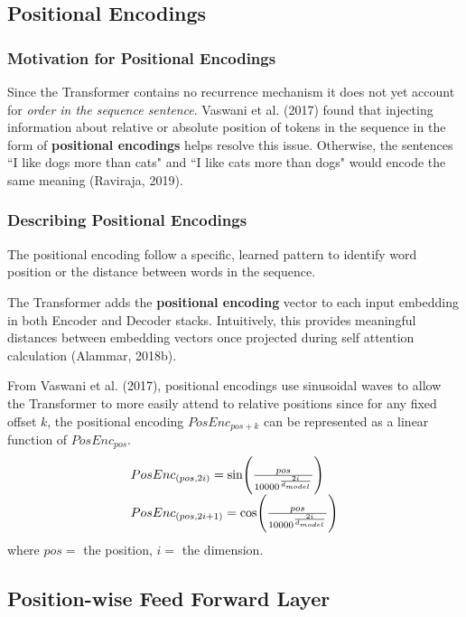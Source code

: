 \subsection{Positional Encodings} \label{sec:PosEncodings}

\subsubsection{Motivation for Positional Encodings}

Since the Transformer contains no recurrence mechanism it does not yet account for \emph{order in the sequence sentence}. Vaswani et al. (2017) found that injecting information about relative or absolute position of tokens in the sequence in the form of \textbf{positional encodings} helps resolve this issue. 
Otherwise, the sentences ``I like dogs more than cats" and ``I like cats more than dogs" would encode the same meaning (Raviraja, 2019). 

\subsubsection{Describing Positional Encodings}

The positional encoding follow a specific, learned pattern to identify word position or the distance between words in the sequence. 

The Transformer adds the \textbf{positional encoding} vector to each input embedding in both Encoder and Decoder stacks. Intuitively, this provides meaningful distances between embedding vectors once projected during self attention calculation (Alammar, 2018b). 

From Vaswani et al. (2017), positional encodings use sinusoidal waves to allow the Transformer to more easily attend to relative positions since for any fixed offset $k$, the positional encoding $PosEnc_{pos + k}$ can be represented as a linear function of $PosEnc_{pos}$.
$$
\begin{array}{ll}
PosEnc_{\Large (pos, 2i)} = \text{sin} \Bigg(\frac {pos} {10000^{\Large \frac {2i} {d_{model}} } }  \Bigg) \\
PosEnc_{\Large (pos, 2i + 1)} = \text{cos} \Bigg(\frac {pos} {10000^{\Large \frac {2i} {d_{model}} } }  \Bigg)
\end{array}
$$
where $pos = $ the position, $i = $ the dimension.


\subsection{Position-wise Feed Forward Layer} \label{sec:PositionwiseFFNLayers}

